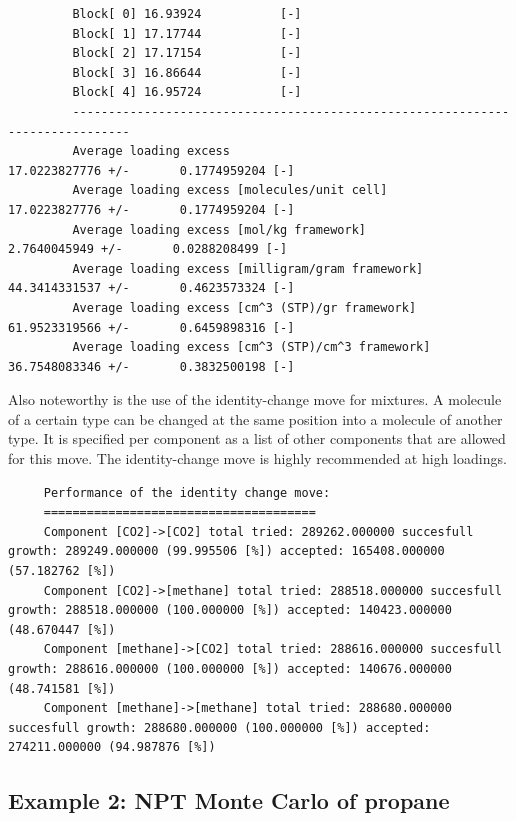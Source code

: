 \begin{tiny}
\begin{verbatim}
         Block[ 0] 16.93924           [-]
         Block[ 1] 17.17744           [-]
         Block[ 2] 17.17154           [-]
         Block[ 3] 16.86644           [-]
         Block[ 4] 16.95724           [-]
         ------------------------------------------------------------------------------
         Average loading excess                             17.0223827776 +/-       0.1774959204 [-]
         Average loading excess [molecules/unit cell]       17.0223827776 +/-       0.1774959204 [-]
         Average loading excess [mol/kg framework]                    2.7640045949 +/-       0.0288208499 [-]
         Average loading excess [milligram/gram framework]           44.3414331537 +/-       0.4623573324 [-]
         Average loading excess [cm^3 (STP)/gr framework]            61.9523319566 +/-       0.6459898316 [-]
         Average loading excess [cm^3 (STP)/cm^3 framework]          36.7548083346 +/-       0.3832500198 [-]
\end{verbatim}
\end{tiny}

Also noteworthy is the use of the identity-change move for mixtures. A molecule of a certain type can be changed at the same position into a molecule of
another type. It is specified per component as a list of other components that are allowed for this move. The identity-change move is highly recommended
at high loadings.
\begin{tiny}
\begin{verbatim}
     Performance of the identity change move:
     ======================================
     Component [CO2]->[CO2] total tried: 289262.000000 succesfull growth: 289249.000000 (99.995506 [%]) accepted: 165408.000000 (57.182762 [%])
     Component [CO2]->[methane] total tried: 288518.000000 succesfull growth: 288518.000000 (100.000000 [%]) accepted: 140423.000000 (48.670447 [%])
     Component [methane]->[CO2] total tried: 288616.000000 succesfull growth: 288616.000000 (100.000000 [%]) accepted: 140676.000000 (48.741581 [%])
     Component [methane]->[methane] total tried: 288680.000000 succesfull growth: 288680.000000 (100.000000 [%]) accepted: 274211.000000 (94.987876 [%])
\end{verbatim}
\end{tiny}

\subsection*{Example 2: NPT Monte Carlo of propane}

